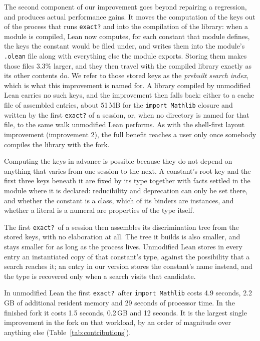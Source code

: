 \documentclass{article}
\newcommand{\Lean}{Lean\xspace}      %
\begin{document}
The second component of our improvement goes beyond repairing a regression, and produces actual performance gains. It moves the computation of the keys out of the process that runs \texttt{exact?} and into the compilation of the library: when a module is compiled, \Lean now computes, for each constant that module defines, the keys the constant would be filed under, and writes them into the module's \texttt{.olean} file along with everything else the module exports. Storing them makes those files 3.3\% larger, and they then travel with the compiled library exactly as its other contents do. We refer to those stored keys as the \emph{prebuilt search index}, which is what this improvement is named for. A library compiled by unmodified \Lean carries no such keys, and the improvement then falls back: either to a cache file of assembled entries, about 51\,MB for the \texttt{import Mathlib} closure and written by the first \texttt{exact?} of a session, or, when no directory is named for that file, to the same walk unmodified \Lean performs. As with the shell-first layout improvement (improvement 2), the full benefit reaches a user only once somebody compiles the library with the fork.

Computing the keys in advance is possible because they do not depend on anything that varies from one session to the next. A constant's root key and the first three keys beneath it are fixed by its type together with facts settled in the module where it is declared: reducibility and deprecation can only be set there, and whether the constant is a class, which of its binders are instances, and whether a literal is a numeral are properties of the type itself.

The first \texttt{exact?}\ of a session then assembles its discrimination tree from the stored keys, with no elaboration at all. The tree it builds is also smaller, and stays smaller for as long as the process lives. Unmodified \Lean stores in every entry an instantiated copy of that constant's type, against the possibility that a search reaches it; an entry in our version stores the constant's name instead, and the type is recovered only when a search visits that candidate.

In unmodified \Lean the first \texttt{exact?}\ after \texttt{import Mathlib} costs 4.9 seconds, 2.2\,GB of additional resident memory and 29 seconds of processor time. In the finished fork it costs 1.5 seconds, 0.2\,GB and 12 seconds. It is the largest single improvement in the fork on that workload, by an order of magnitude over anything else (Table~\ref{tab:contributions}).
\end{document}
